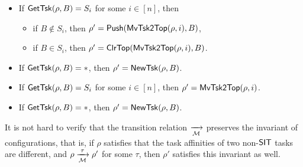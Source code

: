 \noindent {}
\begin{itemize}
	\item If $\mathsf{GetTsk}(\rho, B) = S_i$ for some $i\in[n]$, then
	\begin{itemize}
        \item if $B \not \in S_i$, then $\rho' = \mathsf{Push}(\mathsf{MvTsk2Top}(\rho, i), B)$,
        \item if $B  \in S_i$, 	then $\rho' =  \mathsf{ClrTop}(\mathsf{MvTsk2Top}(\rho, i), B)$.
	\end{itemize}
\item If $\mathsf{GetTsk}(\rho, B) = *$, then $\rho' = \mathsf{NewTsk}(\rho, B)$.
\end{itemize}

\noindent {}
\begin{itemize}
	\item If $\mathsf{GetTsk}(\rho, B) = S_i$ for some $i \in [n]$, then $\rho' = \mathsf{MvTsk2Top}(\rho, i)$.
	\item If $\mathsf{GetTsk}(\rho, B) = *$, then $\rho' = \mathsf{NewTsk}(\rho, B)$.
\end{itemize}
It is not hard to verify that the transition relation $\xrightarrow[{\mathcal{M} }]{}$ preserves the invariant of configurations, that is, if $\rho$ satisfies that the task affinities of two non-${\sf SIT}$ tasks are different, and $\rho \xrightarrow[{\mathcal{M} }]{\tau} \rho'$ for some $\tau$, then $\rho'$ satisfies this invariant as well. 


